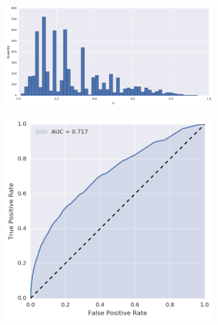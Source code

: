 \begin{figure}[p]
\centering
\begin{subfigure}[t]{\textwidth}
	\centering
	\includegraphics[height=.20\textheight]{figures/bayes/least1/hist_contacts.png}
\end{subfigure}
\begin{subfigure}[b]{.49\textwidth}
	\raggedleft{}
	\includegraphics[height=.20\textheight]{figures/bayes/least1/roc_contacts.png}
\end{subfigure}
\begin{subfigure}[b]{.49\textwidth}
	\raggedright{}

\end{subfigure}
\end{figure}
